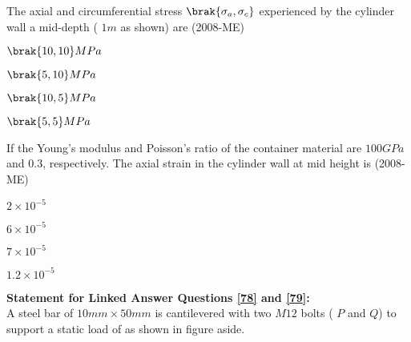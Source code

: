  \item The axial and circumferential stress $\brak{\sigma_a, \sigma_c}$ experienced by the cylinder wall a mid-depth (
 $1m$ as shown) are \label{76} \hfill(2008-ME)
\begin{enumerate}
    \begin{multicols}{4}
        \item $\brak{10,10}MPa$ 
        \item $\brak{5,10}MPa$
        \item $\brak{10,5}MPa$
        \item $\brak{5,5}MPa$
    \end{multicols}
    \end{enumerate}
\item If the Young's modulus and Poisson's ratio of the container material are $100GPa$ and $0.3$, respectively. The axial strain in the cylinder wall at mid height is \label{77} \hfill(2008-ME)
\begin{enumerate}
    \begin{multicols}{2}
        \item $2 \times 10^{-5}$
        \item $6\times 10^{-5}$
        \item $7 \times 10^{-5}$
        \item $1.2 \times 10^{-5}$
    \end{multicols}
\end{enumerate}
\textbf{Statement for Linked Answer Questions \ref{78} and \ref{79}:} \\
A steel bar of $10mm \times 50mm$
 is cantilevered with two $M12$
 bolts ( $P$ and $Q$) to support a static load of 
 as shown in figure aside.

